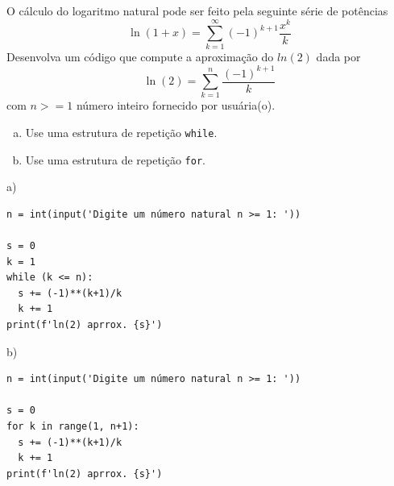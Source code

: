 \begin{exer}
  O cálculo do logaritmo natural pode ser feito pela seguinte série de potências
  \begin{equation}
    \ln(1 + x) = \sum_{k=1}^\infty (-1)^{k+1}\frac{x^k}{k}
  \end{equation}
  Desenvolva um código que compute a aproximação do $ln(2)$ dada por
  \begin{equation}
    \ln(2) = \sum_{k=1}^n \frac{(-1)^{k+1}}{k}
  \end{equation}
  com $n >= 1$ número inteiro fornecido por usuária(o).
  \begin{enumerate}[a)]
  \item Use uma estrutura de repetição \verb+while+.
  \item Use uma estrutura de repetição \verb+for+.
  \end{enumerate}
\end{exer}
\begin{resp}
  a)

\begin{lstlisting}
n = int(input('Digite um número natural n >= 1: '))

s = 0
k = 1
while (k <= n):
  s += (-1)**(k+1)/k
  k += 1
print(f'ln(2) aprrox. {s}')
\end{lstlisting}

b)

\begin{lstlisting}
n = int(input('Digite um número natural n >= 1: '))

s = 0
for k in range(1, n+1):
  s += (-1)**(k+1)/k
  k += 1
print(f'ln(2) aprrox. {s}')
\end{lstlisting}

\end{resp}


